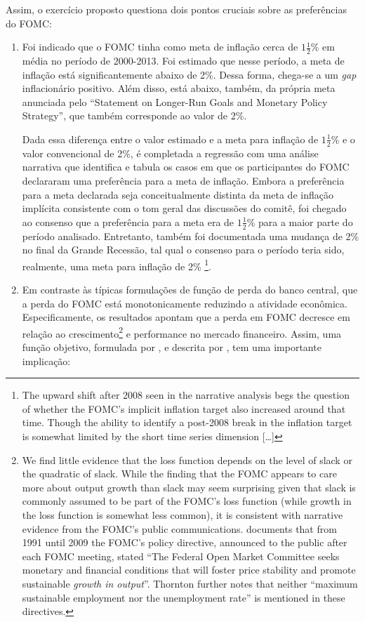 Assim, o exercício proposto questiona dois pontos cruciais sobre as preferências do FOMC:
\begin{enumerate}
    \item Foi indicado que o FOMC tinha como meta de inflação cerca de $1 \frac{1}{2}$\% em média no período de 2000-2013. Foi estimado que nesse período, a meta de inflação está significantemente abaixo de 2\%. Dessa forma, chega-se a um \textit{gap} inflacionário positivo. Além disso, está abaixo, também, da própria meta anunciada pelo ``Statement on Longer-Run Goals and Monetary Policy Strategy'', que também corresponde ao valor de 2\%. 
    
    Dada essa diferença entre o valor estimado e a meta para inflação de $1 \frac{1}{2}$\% e o valor convencional de 2\%, é completada a regressão com uma análise narrativa que identifica e tabula os casos em que os participantes do FOMC declararam uma preferência para a meta de inflação. Embora a preferência para a meta declarada seja conceitualmente distinta da meta de inflação implícita consistente com o tom geral das discussões do comitê, foi chegado ao consenso que a preferência para a meta era de $1 \frac{1}{2}$\% para a maior parte do período analisado. Entretanto, também foi documentada uma mudança de 2\% no final da Grande Recessão, tal qual o consenso para o período teria sido, realmente, uma meta para inflação de 2\% \cite{shapiro2019taking}\footnote{The upward shift after 2008 seen in the narrative analysis begs the question of whether the FOMC's implicit inflation target also increased around that time. Though the ability to identify a post-2008 break in the inflation target is somewhat limited by the short time series dimension [\dots]}.
    
    \item Em contraste às típicas formulações de função de perda do banco central, que a perda do FOMC está monotonicamente reduzindo a atividade econômica. Especificamente, os resultados apontam que a perda em FOMC decresce em relação ao crescimento\footnote{We find little evidence that the loss function depends on the level of slack or the quadratic of slack. While the finding that the FOMC appears to care more about output growth than slack may seem surprising given that slack is commonly assumed to be part of the FOMC's loss function (while growth in the loss function is somewhat less common), it is consistent with narrative evidence from the FOMC's public communications.  documents that from 1991 until 2009 the FOMC's policy directive, announced to the public after each FOMC meeting, stated ``The Federal Open Market Committee seeks monetary and financial conditions that will foster price stability and promote sustainable \textit{growth in output}''. Thornton further notes that neither ``maximum sustainable employment nor the unemployment rate'' is mentioned in these directives.} e performance no mercado financeiro. Assim, uma função objetivo, formulada por , e descrita por , tem uma importante implicação:   


\end{enumerate}

